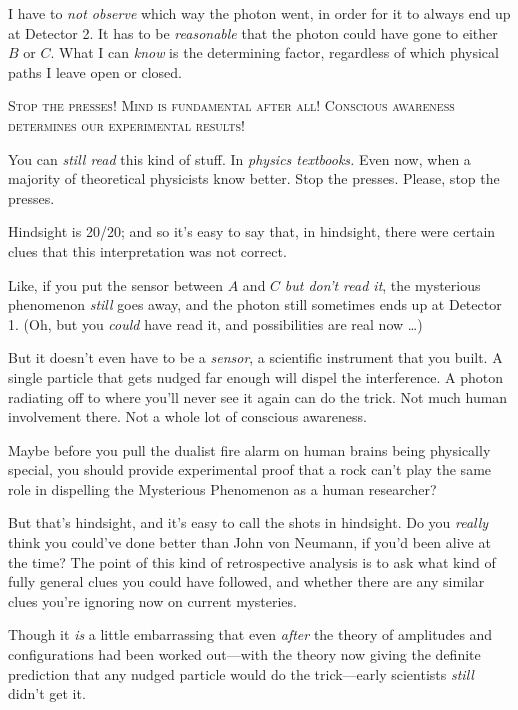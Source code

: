 {
 I have to \textit{not observe} which way the photon went, in order
for it to always end up at Detector 2. It has to be \textit{reasonable}
that the photon could have gone to either $B$ or $C$. What I can
\textit{know} is the determining factor, regardless of which physical
paths I leave open or closed.}

\textsc{
 Stop the presses! Mind is fundamental after all! Conscious
awareness determines our experimental results!}

{
 You can \textit{still read} this kind of stuff. In \textit{physics
textbooks.} Even now, when a majority of theoretical physicists know
better. Stop the presses. Please, stop the presses.}

{
 Hindsight is 20/20; and so it's easy to say that,
in hindsight, there were certain clues that this interpretation was not
correct.}

{
 Like, if you put the sensor between $A$ and $C$ \textit{but
don't read it}, the mysterious phenomenon
\textit{still} goes away, and the photon still sometimes ends up at
Detector 1. (Oh, but you \textit{could} have read it, and possibilities
are real now \ldots)}

{
 But it doesn't even have to be a \textit{sensor},
a scientific instrument that you built. A single particle that gets
nudged far enough will dispel the interference. A photon radiating off
to where you'll never see it again can do the trick.
Not much human involvement there. Not a whole lot of conscious
awareness.}

{
 Maybe before you pull the dualist fire alarm on human brains being
physically special, you should provide experimental proof that a rock
can't play the same role in dispelling the Mysterious
Phenomenon as a human researcher?}

{
 But that's hindsight, and it's
easy to call the shots in hindsight. Do you \textit{really} think you
could've done better than John von Neumann, if
you'd been alive at the time? The point of this kind of
retrospective analysis is to ask what kind of fully general clues you
could have followed, and whether there are any similar clues
you're ignoring now on current mysteries.}

{
 Though it \textit{is} a little embarrassing that even
\textit{after} the theory of amplitudes and configurations had been
worked out---with the theory now giving the definite prediction that
any nudged particle would do the trick---early scientists
\textit{still} didn't get it.}

